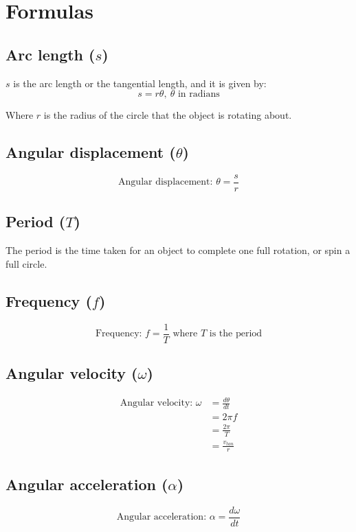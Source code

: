 \documentclass[11pt]{article}
\begin{document}
\newpage

\section{Formulas}
\label{sec:orga707c9b}

\subsection{Arc length (\(s\))}
\label{sec:org5bc164f}
\(s\) is the arc length or the tangential length, and it is given by:
\[s = r \theta, \ \theta \text{ in radians}\]

Where \(r\) is the radius of the circle that the object is rotating about.

\subsection{Angular displacement (\(\theta\))}
\label{sec:orgcaa1944}
\[\text{Angular displacement: } \theta = \frac{s}{r}\]

\subsection{Period (\(T\))}
\label{sec:org4eeaaaf}
The period is the time taken for an object to complete one full rotation, or spin a full circle.

\subsection{Frequency (\(f\))}
\label{sec:org12384b5}
\[\text{Frequency: } f = \frac{1}{T} \text{ where } T \text{ is the period}\]

\subsection{Angular velocity (\(\omega\))}
\label{sec:org52f6d96}
\begin{align*}
\text{Angular velocity: } \omega &= \frac{d \theta}{dt} \\
&= 2 \pi f \\
&= \frac{2 \pi}{T} \\
&= \frac{v_{tan}}{r}
\end{align*}

\subsection{Angular acceleration (\(\alpha\))}
\label{sec:org4dd2b18}
\[\text{Angular acceleration: } \alpha = \frac{d \omega}{dt}\]
\end{document}
